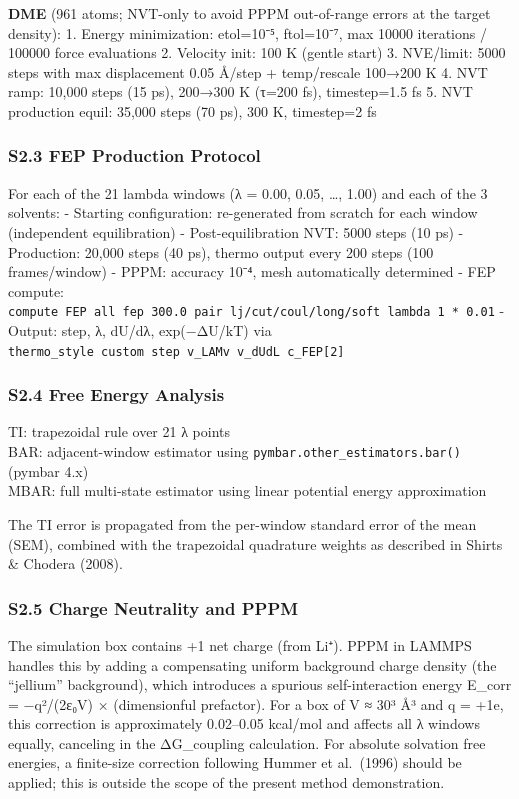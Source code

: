 \documentclass[
  11pt,
]{article}
\begin{document}
\textbf{DME} (961 atoms; NVT-only to avoid PPPM out-of-range errors at
the target density): 1. Energy minimization: etol=10⁻⁵, ftol=10⁻⁷, max
10000 iterations / 100000 force evaluations 2. Velocity init: 100 K
(gentle start) 3. NVE/limit: 5000 steps with max displacement 0.05
Å/step + temp/rescale 100→200 K 4. NVT ramp: 10,000 steps (15 ps),
200→300 K (τ=200 fs), timestep=1.5 fs 5. NVT production equil: 35,000
steps (70 ps), 300 K, timestep=2 fs

\subsubsection{S2.3 FEP Production
Protocol}\label{s2.3-fep-production-protocol}

For each of the 21 lambda windows (λ = 0.00, 0.05, \ldots, 1.00) and
each of the 3 solvents: - Starting configuration: re-generated from
scratch for each window (independent equilibration) - Post-equilibration
NVT: 5000 steps (10 ps) - Production: 20,000 steps (40 ps), thermo
output every 200 steps (100 frames/window) - PPPM: accuracy 10⁻⁴, mesh
automatically determined - FEP compute:
\texttt{compute\ FEP\ all\ fep\ 300.0\ pair\ lj/cut/coul/long/soft\ lambda\ 1\ *\ 0.01}
- Output: step, λ, dU/dλ, exp(−ΔU/kT) via
\texttt{thermo\_style\ custom\ step\ v\_LAMv\ v\_dUdL\ c\_FEP{[}2{]}}

\subsubsection{S2.4 Free Energy
Analysis}\label{s2.4-free-energy-analysis}

TI: trapezoidal rule over 21 λ points\\
BAR: adjacent-window estimator using
\texttt{pymbar.other\_estimators.bar()} (pymbar 4.x)\\
MBAR: full multi-state estimator using linear potential energy
approximation

The TI error is propagated from the per-window standard error of the
mean (SEM), combined with the trapezoidal quadrature weights as
described in Shirts \& Chodera (2008).

\subsubsection{S2.5 Charge Neutrality and
PPPM}\label{s2.5-charge-neutrality-and-pppm}

The simulation box contains +1 net charge (from Li⁺). PPPM in LAMMPS
handles this by adding a compensating uniform background charge density
(the ``jellium'' background), which introduces a spurious
self-interaction energy E\_corr = −q²/(2ε₀V) × (dimensionful prefactor).
For a box of V ≈ 30³ Å³ and q = +1e, this correction is approximately
0.02--0.05 kcal/mol and affects all λ windows equally, canceling in the
ΔG\_coupling calculation. For absolute solvation free energies, a
finite-size correction following Hummer et al.~(1996) should be applied;
this is outside the scope of the present method demonstration.
\end{document}
